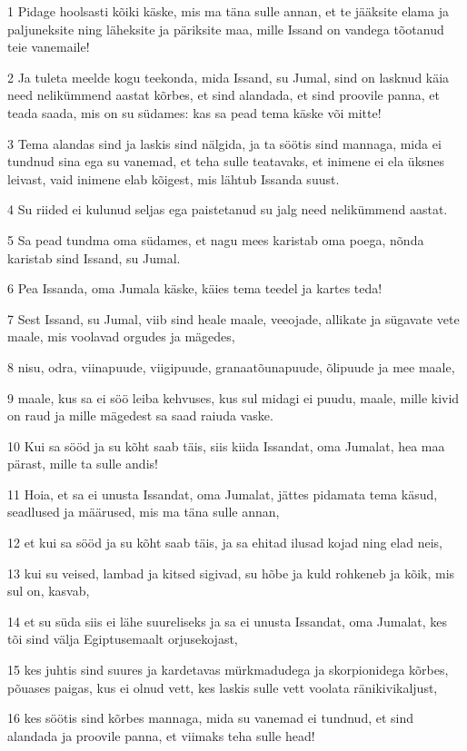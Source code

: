 \par 1 Pidage hoolsasti kõiki käske, mis ma täna sulle annan, et te jääksite elama ja paljuneksite ning läheksite ja päriksite maa, mille Issand on vandega tõotanud teie vanemaile!
\par 2 Ja tuleta meelde kogu teekonda, mida Issand, su Jumal, sind on lasknud käia need nelikümmend aastat kõrbes, et sind alandada, et sind proovile panna, et teada saada, mis on su südames: kas sa pead tema käske või mitte!
\par 3 Tema alandas sind ja laskis sind nälgida, ja ta söötis sind mannaga, mida ei tundnud sina ega su vanemad, et teha sulle teatavaks, et inimene ei ela üksnes leivast, vaid inimene elab kõigest, mis lähtub Issanda suust.
\par 4 Su riided ei kulunud seljas ega paistetanud su jalg need nelikümmend aastat.
\par 5 Sa pead tundma oma südames, et nagu mees karistab oma poega, nõnda karistab sind Issand, su Jumal.
\par 6 Pea Issanda, oma Jumala käske, käies tema teedel ja kartes teda!
\par 7 Sest Issand, su Jumal, viib sind heale maale, veeojade, allikate ja sügavate vete maale, mis voolavad orgudes ja mägedes,
\par 8 nisu, odra, viinapuude, viigipuude, granaatõunapuude, õlipuude ja mee maale,
\par 9 maale, kus sa ei söö leiba kehvuses, kus sul midagi ei puudu, maale, mille kivid on raud ja mille mägedest sa saad raiuda vaske.
\par 10 Kui sa sööd ja su kõht saab täis, siis kiida Issandat, oma Jumalat, hea maa pärast, mille ta sulle andis!
\par 11 Hoia, et sa ei unusta Issandat, oma Jumalat, jättes pidamata tema käsud, seadlused ja määrused, mis ma täna sulle annan,
\par 12 et kui sa sööd ja su kõht saab täis, ja sa ehitad ilusad kojad ning elad neis,
\par 13 kui su veised, lambad ja kitsed sigivad, su hõbe ja kuld rohkeneb ja kõik, mis sul on, kasvab,
\par 14 et su süda siis ei lähe suureliseks ja sa ei unusta Issandat, oma Jumalat, kes tõi sind välja Egiptusemaalt orjusekojast,
\par 15 kes juhtis sind suures ja kardetavas mürkmadudega ja skorpionidega kõrbes, põuases paigas, kus ei olnud vett, kes laskis sulle vett voolata ränikivikaljust,
\par 16 kes söötis sind kõrbes mannaga, mida su vanemad ei tundnud, et sind alandada ja proovile panna, et viimaks teha sulle head!
